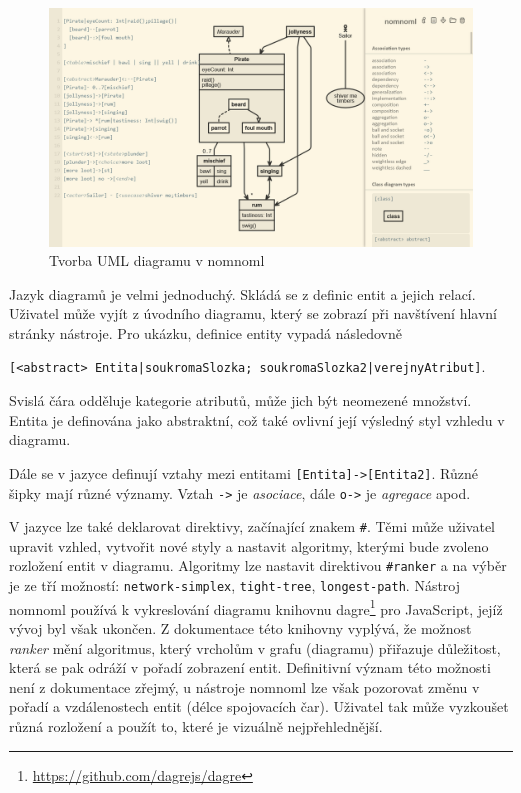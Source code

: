 \begin{figure}[!htb]
  \centering
  \includegraphics[width = \maxwidth{\textwidth}]{../img/nomnoml.png}
  \caption{Tvorba UML diagramu v nomnoml}
  \label{fig:nomnoml}
\end{figure}

Jazyk diagramů je velmi jednoduchý.
Skládá se z definic entit a jejich relací.
Uživatel může vyjít z úvodního diagramu, který se zobrazí při navštívení hlavní stránky nástroje.
Pro ukázku, definice entity vypadá následovně

\noindent\texttt{[<abstract> Entita|soukromaSlozka; soukromaSlozka2|verejnyAtribut]}.

Svislá čára odděluje kategorie atributů, může jich být neomezené množství.
Entita je definována jako abstraktní, což také ovlivní její výsledný styl vzhledu v diagramu.

Dále se v jazyce definují vztahy mezi entitami \texttt{[Entita]->[Entita2]}.
Různé šipky mají různé významy.
Vztah \texttt{->} je \emph{asociace}, dále \texttt{o->} je \emph{agregace} apod.

V jazyce lze také deklarovat direktivy, začínající znakem \texttt{\#}.
Těmi může uživatel upravit vzhled, vytvořit nové styly a nastavit algoritmy, kterými bude zvoleno rozložení entit v diagramu.
Algoritmy lze nastavit direktivou \texttt{\#ranker} a na výběr je ze tří možností: \texttt{network-simplex}, \texttt{tight-tree}, \texttt{longest-path}.
Nástroj nomnoml používá k vykreslování diagramu knihovnu dagre\footnote{\url{https://github.com/dagrejs/dagre}} pro JavaScript, jejíž vývoj byl však ukončen.
Z dokumentace této knihovny vyplývá, že možnost \emph{ranker} mění algoritmus, který vrcholům v grafu (diagramu) přiřazuje důležitost, která se pak odráží v pořadí zobrazení entit.
Definitivní význam této možnosti není z dokumentace zřejmý, u nástroje nomnoml lze však pozorovat změnu v pořadí a vzdálenostech entit (délce spojovacích čar).
Uživatel tak může vyzkoušet různá rozložení a použít to, které je vizuálně nejpřehlednější.

